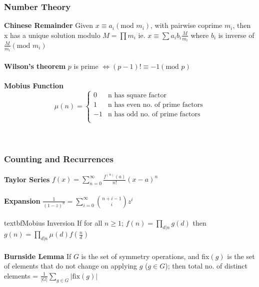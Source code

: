 \subsubsection {Number Theory}
\textbf{Chinese Remainder} Given $x \equiv a_i (\text{mod } m_i)$, with pairwise coprime $m_i$, then x has a unique solution modulo $M = \prod m_i$ ie. $x \equiv \sum a_i b_i \frac{M}{m_i}$ where $b_i$ is inverse of $\frac{M}{m_i} (\text{mod }m_i)$
\\
\\
\textbf{Wilson's theorem} $p$ is prime $\iff (p-1)! \equiv -1 (\text{mod }p)$
\\
\\
\textbf{Mobius Function}
\[ \mu(n) = \begin{cases}
      0 & \text{n has square factor} \\
      1 & \text{n has even no. of prime factors} \\
      -1 & \text{n has odd no. of prime factors} \\
   \end{cases}
\]
\\
\\

\subsubsection {Counting and Recurrences}
\textbf{Taylor Series} $f(x) = \sum\limits_{n = 0}^{\infty} \frac{f^{(n)}(a)}{n!}(x-a)^n$
\\
\\
\textbf{Expansion} $\frac{1}{(1-z)^n} = \sum\limits_{i=0}^{\infty} \binom{n+i-1}{i}z^i$
\\
\\
textbf{Mobius Inversion} If for all $n \geq 1$;  $f(n) = \prod\limits_{d|n} g(d)$ then $g(n) = \prod\limits_{d|n} \mu(d)f(\frac{n}{d})$
\\
\\
\textbf{Burnside Lemma} If $G$ is the set of symmetry operations, and fix$(g)$ is the set of elements that do not change on applying $g$ ($g \in G$); then total no. of distinct elements = $\frac{1}{|G|} \sum\limits_{g\in G} |\text{fix}(g)|$
